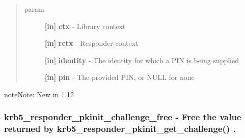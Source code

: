 \documentclass[letterpaper,10pt,english]{sphinxmanual}
\begin{document}
\begin{fulllineitems}
\label{appdev/refs/api/krb5_responder_pkinit_set_answer:c.krb5_responder_pkinit_set_answer}
\end{fulllineitems}

\begin{quote}\begin{description}
\item[{param}] \leavevmode
\textbf{{[}in{]}} \textbf{ctx} - Library context

\textbf{{[}in{]}} \textbf{rctx} - Responder context

\textbf{{[}in{]}} \textbf{identity} - The identity for which a PIN is being supplied

\textbf{{[}in{]}} \textbf{pin} - The provided PIN, or NULL for none

\end{description}\end{quote}

\begin{notice}{note}{Note:}
New in 1.12
\end{notice}


\subsubsection{krb5\_responder\_pkinit\_challenge\_free -  Free the value returned by krb5\_responder\_pkinit\_get\_challenge() .}
\label{appdev/refs/api/krb5_responder_pkinit_challenge_free:krb5-responder-pkinit-challenge-free-free-the-value-returned-by-krb5-responder-pkinit-get-challenge}\label{appdev/refs/api/krb5_responder_pkinit_challenge_free::doc}

\begin{fulllineitems}
\label{appdev/refs/api/krb5_responder_pkinit_challenge_free:c.krb5_responder_pkinit_challenge_free}
\end{fulllineitems}
\end{document}
